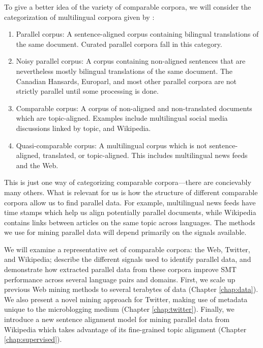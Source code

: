 To give a better idea of the variety of comparable corpora, we will consider the
categorization of multilingual corpora given by \citet{Fung04a}:
\begin{enumerate}
\item Parallel corpus: A sentence-aligned corpus containing bilingual
translations of the same document. Curated parallel corpora fall in this
category.
\item Noisy parallel corpus: A corpus containing non-aligned sentences that are
nevertheless mostly bilingual translations of the same document. The Canadian Hansards,
Europarl, and most other parallel corpora are not strictly parallel until some
processing is done.
\item Comparable corpus: A corpus of non-aligned and non-translated documents
which are topic-aligned. Examples include multilingual social media discussions
linked by topic, and Wikipedia.
\item Quasi-comparable corpus: A multilingual corpus which is not
sentence-aligned, translated, or topic-aligned. This includes multilingual news
feeds and the Web.
\end{enumerate}
This is just one way of categorizing comparable corpora---there are concievably
many others. What is relevant for us is how the structure of different
comparable corpora allow us to find parallel data. For example, multilingual news feeds have
time stamps which help us align potentially parallel documents, while Wikipedia
contains links between articles on the same topic across languages. The methods
we use for mining parallel data will depend primarily on the signals available.

We will examine a representative set of comparable corpora: the Web, Twitter,
and Wikipedia; describe the different signals used to identify parallel data,
and demonstrate how extracted parallel data from these corpora improve SMT
performance across several language pairs and domains. First, we scale up
previous Web mining methods \citep{Resnik03} to several terabytes of data
(Chapter \ref{chap:data}). We
also present a novel mining approach for Twitter, making use of metadata unique
to the microblogging medium (Chapter \ref{chap:twitter}). Finally, we introduce a new sentence alignment
model for mining parallel data from Wikipedia which takes advantage of its
fine-grained topic alignment (Chapter \ref{chap:supervised}).

